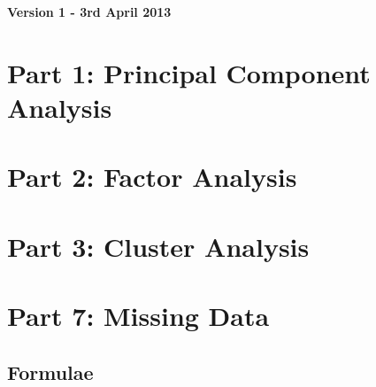 \documentclass[a4paper,12pt]{article}
\begin{document}
\textbf{Version 1 - 3rd April 2013}


\bigskip
\section*{Part 1: Principal Component Analysis}

\section*{Part 2: Factor Analysis}
\section*{Part 3: Cluster Analysis}

\section*{Part 7: Missing Data}

\subsection*{Formulae}
\end{document}
